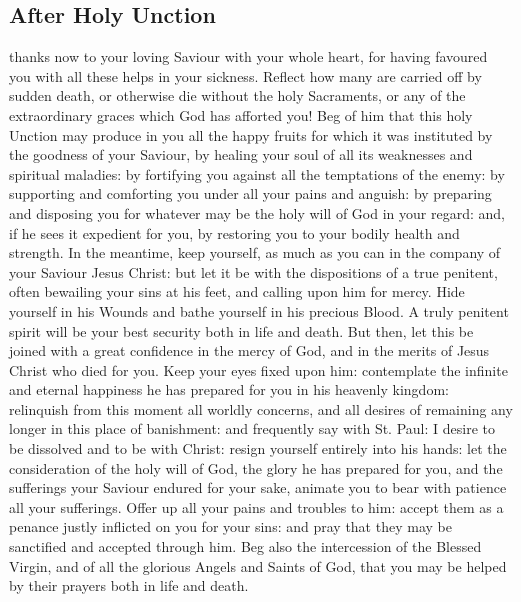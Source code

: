 \clearpage
\subsection{After Holy Unction}\par\noindent
{} thanks now to your loving Saviour with your whole heart, for having favoured you with all these helps in your sickness. Reflect how many are carried off by sudden death, or otherwise die without the holy Sacraments, or any of the extraordinary graces which God has afforted you! Beg of him that this holy Unction may produce in you all the happy fruits for which it was instituted by the goodness of your Saviour, by healing your soul of all its weaknesses and spiritual maladies: by fortifying you against all the temptations of the enemy: by supporting and comforting you under all your pains and anguish: by preparing and disposing you for whatever may be the holy will of God in your regard: and, if he sees it expedient for you, by restoring you to your bodily health and strength. In the meantime, keep yourself, as much as you can in the company of your Saviour Jesus Christ: but let it be with the dispositions of a true penitent, often bewailing your sins at his feet, and calling upon him for mercy. Hide yourself in his Wounds and bathe yourself in his precious Blood. A truly penitent spirit will be your best security both in life and death. But then, let this be joined with a great confidence in the mercy of God, and in the merits of Jesus Christ who died for you. Keep your eyes fixed upon him: contemplate the infinite and eternal happiness he has prepared for you in his heavenly kingdom: relinquish from this moment all worldly concerns, and all desires of remaining any longer in this place of banishment: and frequently say with St. Paul: I desire to be dissolved and to be with Christ: resign yourself entirely into his hands: let the consideration of the holy will of God, the glory he has prepared for you, and the sufferings your Saviour endured for your sake, animate you to bear with patience all your sufferings. Offer up all your pains and troubles to him: accept them as a penance justly inflicted on you for your sins: and pray that they may be sanctified and accepted through him. Beg also the intercession of the Blessed Virgin, and of all the glorious Angels and Saints of God, that you may be helped by their prayers both in life and death.

\clearpage
